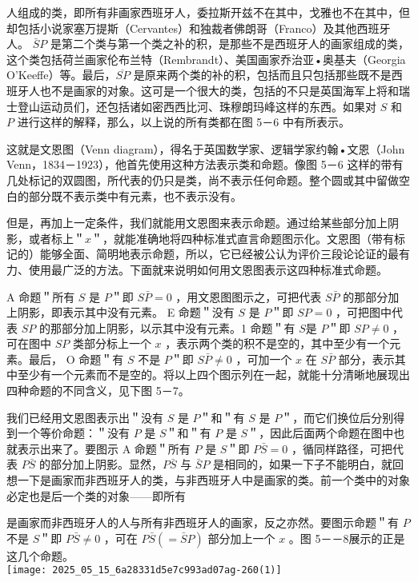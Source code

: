 人组成的类，即所有非画家西班牙人，委拉斯开兹不在其中，戈雅也不在其中，但却包括小说家塞万提斯（Cervantes）和独裁者佛朗哥（Franco）及其他西班牙人。 $\bar{S} P$ 是第二个类与第一个类之补的积，是那些不是西班牙人的画家组成的类，这个类包括荷兰画家伦布兰特（Rembrandt）、美国画家乔治亚•奥基夫（Georgia O’Keeffe）等。最后，$\overline{S P}$ 是原来两个类的补的积，包括而且只包括那些既不是西班牙人也不是画家的对象。这可是一个很大的类，包括的不只是英国海军上将和瑞士登山运动员们，还包括诸如密西西比河、珠穆朗玛峰这样的东西。如果对 $S$ 和 $P$ 进行这样的解释，那么，以上说的所有类都在图 5－6 中有所表示。

这就是文恩图（Venn diagram），得名于英国数学家、逻辑学家约翰•文恩（John Venn，1834－1923），他首先使用这种方法表示类和命题。像图 5－6 这样的带有几处标记的双圆图，所代表的仍只是类，尚不表示任何命题。整个圆或其中留做空白的部分既不表示类中有元素，也不表示没有。

但是，再加上一定条件，我们就能用文恩图来表示命题。通过给某些部分加上阴影，或者标上＂$x$＂，就能准确地将四种标准式直言命题图示化。文恩图（带有标记的）能够全面、简明地表示命题，所以，它已经被公认为评价三段论论证的最有力、使用最广泛的方法。下面就来说明如何用文恩图表示这四种标准式命题。

A 命题＂所有 $S$ 是 $P$＂即 $S \bar{P}=0$ ，用文恩图图示之，可把代表 $S \bar{P}$ 的那部分加上阴影，即表示其中没有元素。 E 命题＂没有 $S$ 是 $P$＂即 $S P=0$ ，可把图中代表 $S P$ 的那部分加上阴影，以示其中没有元素。1 命题＂有 $S$是 $P$＂即 $S P \neq 0$ ，可在图中 $S P$ 类部分标上一个 $x$ ，表示两个类的积不是空的，其中至少有一个元素。最后， O 命题＂有 $S$ 不是 $P$＂即 $S \bar{P} \neq 0$ ，可加一个 $x$ 在 $S \bar{P}$ 部分，表示其中至少有一个元素而不是空的。将以上四个图示列在一起，就能十分清晰地展现出四种命题的不同含义，见下图 5－7。

我们已经用文恩图表示出＂没有 $S$ 是 $P$＂和＂有 $S$ 是 $P$＂，而它们换位后分别得到一个等价命题：＂没有 $P$ 是 $S$＂和＂有 $P$ 是 $S$＂，因此后面两个命题在图中也就表示出来了。要图示 A 命题＂所有 $P$ 是 $S$＂即 $P \bar{S}=0$ ，循同样路径，可把代表 $P \bar{S}$ 的部分加上阴影。显然，$P \bar{S}$ 与 $\bar{S} P$ 是相同的，如果一下子不能明白，就回想一下是画家而非西班牙人的类，与非西班牙人中是画家的类。前一个类中的对象必定也是后一个类的对象——即所有

是画家而非西班牙人的人与所有非西班牙人的画家，反之亦然。要图示命题＂有 $P$ 不是 $S$＂即 $P \bar{S} \neq 0$ ，可在 $P \bar{S}(=\bar{S} P)$ 部分加上一个 $x$ 。图 5－－8展示的正是这几个命题。\\
\texttt{[image: 2025\_05\_15\_6a28331d5e7c993ad07ag-260(1)]}


